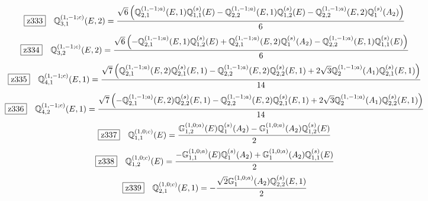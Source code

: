 \documentclass[fleqn,10pt,landscape]{jsarticle}
\begin{document}
\begin{dmath*}
\hspace*{3mm}\fbox{z333}\quad \mathbb{Q}_{3,1}^{(1,-1;c)}(E,2)=\frac{\sqrt{6} \left(\mathbb{Q}_{2,1}^{(1,-1;a)}(E,1) \mathbb{Q}_{1,1}^{(s)}(E) - \mathbb{Q}_{2,2}^{(1,-1;a)}(E,1) \mathbb{Q}_{1,2}^{(s)}(E) - \mathbb{Q}_{2,2}^{(1,-1;a)}(E,2) \mathbb{Q}_{1}^{(s)}(A_{2})\right)}{6}
\end{dmath*}
\begin{dmath*}
\hspace*{3mm}\fbox{z334}\quad \mathbb{Q}_{3,2}^{(1,-1;c)}(E,2)=\frac{\sqrt{6} \left(- \mathbb{Q}_{2,1}^{(1,-1;a)}(E,1) \mathbb{Q}_{1,2}^{(s)}(E) + \mathbb{Q}_{2,1}^{(1,-1;a)}(E,2) \mathbb{Q}_{1}^{(s)}(A_{2}) - \mathbb{Q}_{2,2}^{(1,-1;a)}(E,1) \mathbb{Q}_{1,1}^{(s)}(E)\right)}{6}
\end{dmath*}
\begin{dmath*}
\hspace*{3mm}\fbox{z335}\quad \mathbb{Q}_{4,1}^{(1,-1;c)}(E,1)=\frac{\sqrt{7} \left(\mathbb{Q}_{2,1}^{(1,-1;a)}(E,2) \mathbb{Q}_{2,1}^{(s)}(E,1) - \mathbb{Q}_{2,2}^{(1,-1;a)}(E,2) \mathbb{Q}_{2,2}^{(s)}(E,1) + 2 \sqrt{3} \mathbb{Q}_{2}^{(1,-1;a)}(A_{1}) \mathbb{Q}_{2,1}^{(s)}(E,1)\right)}{14}
\end{dmath*}
\begin{dmath*}
\hspace*{3mm}\fbox{z336}\quad \mathbb{Q}_{4,2}^{(1,-1;c)}(E,1)=\frac{\sqrt{7} \left(- \mathbb{Q}_{2,1}^{(1,-1;a)}(E,2) \mathbb{Q}_{2,2}^{(s)}(E,1) - \mathbb{Q}_{2,2}^{(1,-1;a)}(E,2) \mathbb{Q}_{2,1}^{(s)}(E,1) + 2 \sqrt{3} \mathbb{Q}_{2}^{(1,-1;a)}(A_{1}) \mathbb{Q}_{2,2}^{(s)}(E,1)\right)}{14}
\end{dmath*}
\begin{dmath*}
\hspace*{3mm}\fbox{z337}\quad \mathbb{Q}_{1,1}^{(1,0;c)}(E)=\frac{\mathbb{G}_{1,2}^{(1,0;a)}(E) \mathbb{Q}_{1}^{(s)}(A_{2}) - \mathbb{G}_{1}^{(1,0;a)}(A_{2}) \mathbb{Q}_{1,2}^{(s)}(E)}{2}
\end{dmath*}
\begin{dmath*}
\hspace*{3mm}\fbox{z338}\quad \mathbb{Q}_{1,2}^{(1,0;c)}(E)=\frac{- \mathbb{G}_{1,1}^{(1,0;a)}(E) \mathbb{Q}_{1}^{(s)}(A_{2}) + \mathbb{G}_{1}^{(1,0;a)}(A_{2}) \mathbb{Q}_{1,1}^{(s)}(E)}{2}
\end{dmath*}
\begin{dmath*}
\hspace*{3mm}\fbox{z339}\quad \mathbb{Q}_{2,1}^{(1,0;c)}(E,1)=- \frac{\sqrt{2} \mathbb{G}_{1}^{(1,0;a)}(A_{2}) \mathbb{Q}_{2,2}^{(s)}(E,1)}{2}
\end{dmath*}
\end{document}
